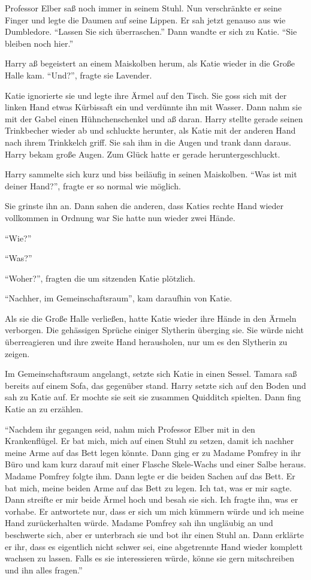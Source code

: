 Professor Elber saß noch immer in seinem Stuhl. Nun verschränkte er seine Finger und legte die Daumen auf seine Lippen. Er sah jetzt genauso aus wie Dumbledore. \enquote{Lassen Sie sich überraschen.} Dann wandte er sich zu Katie. \enquote{Sie bleiben noch hier.}

Harry aß begeistert an einem Maiskolben herum, als Katie wieder in die Große Halle kam. \enquote{Und?}, fragte sie Lavender.

Katie ignorierte sie und legte ihre Ärmel auf den Tisch. Sie goss sich mit der linken Hand etwas Kürbissaft ein und verdünnte ihn mit Wasser. Dann nahm sie mit der Gabel einen Hühnchenschenkel und aß daran. Harry stellte gerade seinen Trinkbecher wieder ab und schluckte herunter, als Katie mit der anderen Hand nach ihrem Trinkkelch griff. Sie sah ihm in die Augen und trank dann daraus. Harry bekam große Augen. Zum Glück hatte er gerade heruntergeschluckt.

Harry sammelte sich kurz und biss beiläufig in seinen Maiskolben. \enquote{Was ist mit deiner Hand?}, fragte er so normal wie möglich.

Sie grinste ihn an. Dann sahen die anderen, dass Katies rechte Hand wieder vollkommen in Ordnung war Sie hatte nun wieder zwei Hände.

\enquote{Wie?}

\enquote{Was?}

\enquote{Woher?}, fragten die um sitzenden Katie plötzlich.

\enquote{Nachher, im Gemeinschaftsraum}, kam daraufhin von Katie.

Als sie die Große Halle verließen, hatte Katie wieder ihre Hände in den Ärmeln verborgen. Die gehässigen Sprüche einiger Slytherin überging sie. Sie würde nicht überreagieren und ihre zweite Hand herausholen, nur um es den Slytherin zu zeigen.

Im Gemeinschaftsraum angelangt, setzte sich Katie in einen Sessel. Tamara saß bereits auf einem Sofa, das gegenüber stand. Harry setzte sich auf den Boden und sah zu Katie auf. Er mochte sie seit sie zusammen Quidditch spielten. Dann fing Katie an zu erzählen.

\enquote{Nachdem ihr gegangen seid, nahm mich Professor Elber mit in den Krankenflügel. Er bat mich, mich auf einen Stuhl zu setzen, damit ich nachher meine Arme auf das Bett legen könnte. Dann ging er zu Madame Pomfrey in ihr Büro und kam kurz darauf mit einer Flasche Skele-Wachs und einer Salbe heraus. Madame Pomfrey folgte ihm. Dann legte er die beiden Sachen auf das Bett. Er bat mich, meine beiden Arme auf das Bett zu legen. Ich tat, was er mir sagte. Dann streifte er mir beide Ärmel hoch und besah sie sich. Ich fragte ihn, was er vorhabe. Er antwortete nur, dass er sich um mich kümmern würde und ich meine Hand zurückerhalten würde. Madame Pomfrey sah ihn ungläubig an und beschwerte sich, aber er unterbrach sie und bot ihr einen Stuhl an. Dann erklärte er ihr, dass es eigentlich nicht schwer sei, eine abgetrennte Hand wieder komplett wachsen zu lassen. Falls es sie interessieren würde, könne sie gern mitschreiben und ihn alles fragen.}

